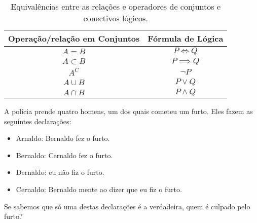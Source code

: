 \begin{table}[h]
\begin{center}
\caption{Equivalências entre as relações e operadores de conjuntos e conectivos lógicos.}
\label{tbl:equiv-conj-logc}
\begin{tabular}{|c|c|}
	\hline
	Operação/relação em Conjuntos & Fórmula de Lógica \\\hline
	$A=B$ & $P \iff Q$ \\ \hline
	$A \subset B$ & $P \implies Q$ \\ \hline
	$A^C$ & $\neg P$ \\ \hline
	$A \cup B$ & $P \lor Q$ \\ \hline
	$A \cap B$ & $P \land Q$ \\
	\hline
\end{tabular}
\end{center}
\end{table}

\begin{problem}
A polícia prende quatro homens, um dos quais cometeu um furto. Eles fazem as seguintes declarações:
%
\begin{itemize}[leftmargin=*]
  \item Arnaldo: Bernaldo fez o furto.
  \item Bernaldo: Cernaldo fez o furto.
  \item Dernaldo: eu não fiz o furto.
  \item Cernaldo: Bernaldo mente ao dizer que eu fiz o furto.
\end{itemize}
%
Se sabemos que só uma destas declarações é a verdadeira, quem é culpado pelo furto?
\end{problem}
